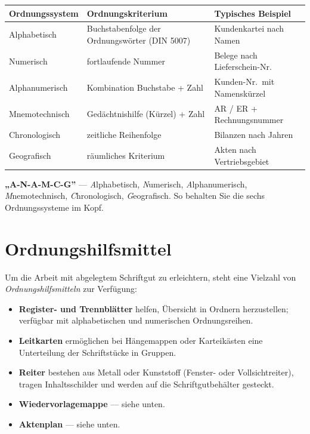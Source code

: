 \documentclass[11pt, a4paper]{article}
\begin{document}
\begin{center}
\begin{tabular}{p{2.9cm} p{5.2cm} p{4.4cm}}
\toprule
\textbf{Ordnungssystem} & \textbf{Ordnungskriterium} & \textbf{Typisches Beispiel}\\
\midrule
Alphabetisch & Buchstabenfolge der Ordnungswörter (DIN 5007) & Kundenkartei nach Namen\\
Numerisch & fortlaufende Nummer & Belege nach Lieferschein-Nr.\\
Alphanumerisch & Kombination Buchstabe + Zahl & Kunden-Nr.\ mit Namenskürzel\\
Mnemotechnisch & Gedächtnishilfe (Kürzel) + Zahl & AR / ER + Rechnungsnummer\\
Chronologisch & zeitliche Reihenfolge & Bilanzen nach Jahren\\
Geografisch & räumliches Kriterium & Akten nach Vertriebsgebiet\\
\bottomrule
\end{tabular}
\end{center}

\begin{eselsbruecke}
\textbf{„A-N-A-M-C-G”} --- \emph{A}lphabetisch, \emph{N}umerisch, \emph{A}lphanumerisch,
\emph{M}nemotechnisch, \emph{C}hronologisch, \emph{G}eografisch. So behalten Sie die
sechs Ordnungssysteme im Kopf.
\end{eselsbruecke}

\section{Ordnungshilfsmittel}

Um die Arbeit mit abgelegtem Schriftgut zu erleichtern, steht eine Vielzahl von
\emph{Ordnungshilfsmitteln} zur Verfügung:

\begin{itemize}
  \item \textbf{Register- und Trennblätter} helfen, Übersicht in Ordnern herzustellen;
    verfügbar mit alphabetischen und numerischen Ordnungsreihen.
  \item \textbf{Leitkarten} ermöglichen bei Hängemappen oder Karteikästen eine
    Unterteilung der Schriftstücke in Gruppen.
  \item \textbf{Reiter} bestehen aus Metall oder Kunststoff (Fenster- oder
    Vollsichtreiter), tragen Inhaltsschilder und werden auf die Schriftgutbehälter
    gesteckt.
  \item \textbf{Wiedervorlagemappe} --- siehe unten.
  \item \textbf{Aktenplan} --- siehe unten.
\end{itemize}
\end{document}

